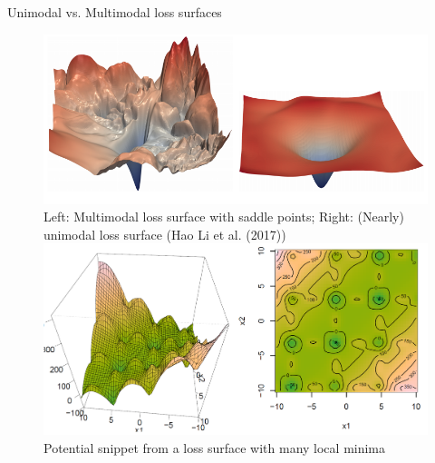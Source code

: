 \begin{vbframe}{Unimodal vs. Multimodal loss surfaces}
\begin{figure}
\centering
\includegraphics[width=12cm]{figure_man/difficult_vs_easy.png}
\footnotesize{Left: Multimodal loss surface with saddle points; Right: (Nearly) unimodal loss surface (Hao Li et al. (2017))}
\centering
\vspace{1cm}
\includegraphics[width=.9\textwidth]{figure_man/multimodal.png}
\footnotesize{Potential snippet from a loss surface with many local minima}
\end{figure}

\end{vbframe}


